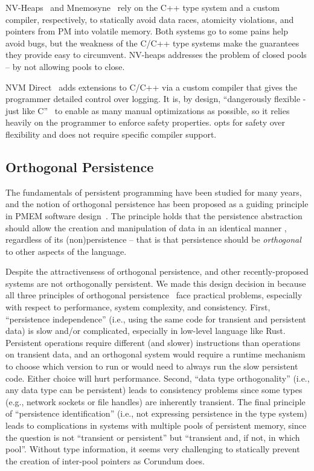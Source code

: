 NV-Heaps~\cite{nvheaps} and Mnemosyne~\cite{mnemosyne} rely on the C++ type system and a custom compiler, respectively, to statically avoid data races, atomicity violations, and pointers from PM into volatile memory.  Both systems go to some pains help avoid bugs, but the weakness of the C/C++ type systems make the guarantees they provide easy to circumvent.  NV-heaps addresses the problem of closed pools -- by not allowing pools to close.

NVM Direct~\cite{oracle-nvm-direct} adds extensions to C/C++ via a custom compiler that gives the programmer detailed control over logging.  It is, by design, ``dangerously flexible - just like C''~\cite{personalbillbridge} to enable as many manual optimizations as possible, so it relies heavily on the programmer to enforce safety properties.  \This{} opts for safety over flexibility and does not require specific compiler support.

\subsection{Orthogonal Persistence}

The fundamentals of persistent programming have been studied for many years,
and the notion of orthogonal persistence has been proposed as a guiding
principle in PMEM software design~\cite{atkinson1995orthogonally}.  The
principle holds that the persistence abstraction should allow the creation and
manipulation of data in an identical manner , regardless of its
(non)persistence -- that is that persistence should be \emph{orthogonal} to
other aspects of the language.


Despite the attractivensess of orthogonal persistence, \this{} and other
recently-proposed systems are not orthogonally persistent.  We made this design
decision in \this{} because all three principles of orthogonal persistence~\cite{atkinson1995orthogonally} face practical
problems, especially with respect to performance, system complexity, and
consistency.  First, “persistence independence” (i.e., using the same code for
transient and persistent data) is slow and/or complicated, especially in
low-level language like Rust. Persistent operations require different (and
slower) instructions than operations on transient data, and an orthogonal
system would require a runtime mechanism to choose which version to run or
would need to always run the slow persistent code.  Either choice will hurt
performance.  Second, “data type orthogonality” (i.e., any data type can be persistent) leads to consistency problems
since some types (e.g., network sockets or file handles) are inherently
transient. The final principle of “persistence identification” (i.e., not
expressing persistence in the type system) leads to complications in systems
with multiple pools of persistent memory, since the question is not “transient
or persistent” but “transient and, if not, in which pool”.  Without type
information, it seems very challenging to statically prevent the creation of
inter-pool pointers as Corundum does.

